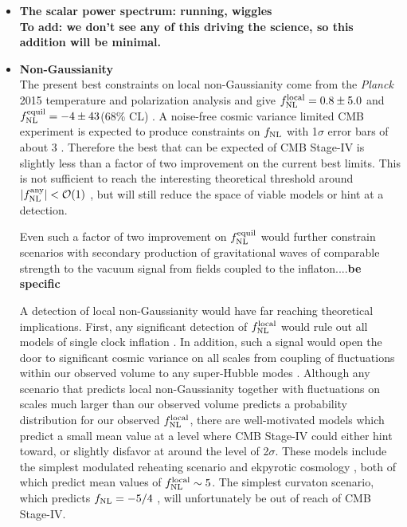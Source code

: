 \begin{itemize}
\item {\bf The scalar power spectrum: running, wiggles}\\
{\bf To add: we don't see any of this driving the science, so this addition will be minimal. }
 
\item {\bf Non-Gaussianity}\\
The present best constraints on local non-Gaussianity come from the {\it Planck} 2015 temperature and polarization analysis and give $f_{\rm NL}^{\rm local} = 0.8 \pm 5.0$ and $f_{\rm NL}^{\rm equil} = -4 \pm 43$(68\% CL) \cite{Ade:2015ava}. A noise-free cosmic variance limited CMB experiment is expected to produce constraints on $f_{\rm NL}$ with 1$\sigma$ error bars of about 3 \cite{Komatsu:2001rj}. Therefore the best that can be expected of CMB Stage-IV is slightly less than a factor of two improvement on the current best limits. This is not sufficient to reach the interesting theoretical threshold around $|f_{\rm NL}^{\rm any}|<\mathcal{O}(1)$ \cite{Alvarez:2014vva}, but will still reduce the space of viable models or hint at a detection.

Even such a factor of two improvement on $f_{\rm NL}^{\rm equil}$ would further constrain scenarios with secondary production of gravitational waves of comparable strength to the vacuum signal from fields coupled to the inflaton....{\bf be specific}

A detection of local non-Gaussianity would have far reaching theoretical implications. First, any significant detection of $f_{\rm NL}^{\rm local}$ would rule out all models of single clock inflation \cite{Creminelli:2004yq}. In addition, such a signal would open the door to significant cosmic variance on all scales from coupling of fluctuations within our observed volume to any super-Hubble modes \cite{}. Although any scenario that predicts local non-Gaussianity together with fluctuations on scales much larger than our observed volume predicts a probability distribution for our observed $f_{\rm NL}^{\rm local}$, there are well-motivated models which predict a small mean value at a level where CMB Stage-IV could either hint toward, or slightly disfavor at around the level of 2$\sigma$. These models include the simplest modulated reheating scenario \cite{Zaldarriaga:2003my} and ekpyrotic cosmology \cite{Lehners:2009ja}, both of which predict mean values of $f_{\rm NL}^{\rm local}\sim5$. The simplest curvaton scenario, which predicts $f_{\rm NL} = -5/4$ \cite{Lyth:2001nq}, will unfortunately be out of reach of CMB Stage-IV.


\end{itemize}
